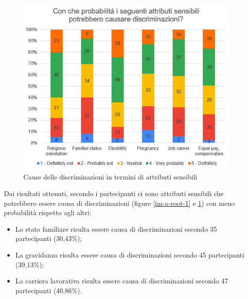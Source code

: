 \begin{figure}[h!]
    \centering
    \includegraphics[width=360pt]{figure/data-analysis2/root2.png}
    \caption{Cause delle discriminazioni in termini di attributi sensibili}
    \label{im-a-root-2}
\end{figure}

Dai risultati ottenuti, secondo i partecipanti ci sono attributi sensibili che potrebbero essere causa di discriminazioni (figure \ref{im-a-root-1} e \ref{im-a-root-2}) con meno probabilità rispetto agli altri:
\begin{itemize}
    \item Lo stato familiare risulta essere causa di discriminazioni secondo 35 partecipanti (30,43\%);
    \item La gravidanza risulta essere causa di discriminazioni secondo 45 partecipanti (39,13\%);
    \item La carriera lavorativa risulta essere causa di discriminazioni secondo 47 partecipanti (40,86\%).
\end{itemize}

